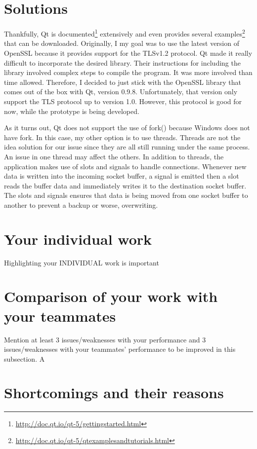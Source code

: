 \documentclass[12pt,a4paper]{report}
\begin{document}
	\section{Solutions}
	Thankfully, Qt is documented\footnote{\url{http://doc.qt.io/qt-5/gettingstarted.html}} extensively and even provides several examples\footnote{\url{http://doc.qt.io/qt-5/qtexamplesandtutorials.html}} that can be downloaded. Originally, I my goal was to use the latest version of OpenSSL because it provides support for the TLSv1.2 protocol. Qt made it really difficult to incorporate the desired library. Their instructions for including the library involved complex steps to compile the program. It was more involved than time allowed. Therefore, I decided to just stick with the OpenSSL library that comes out of the box with Qt, version 0.9.8. Unfortunately, that version only support the TLS protocol up to version 1.0. However, this protocol is good for now, while the prototype is being developed. 
	
	As it turns out, Qt does not support the use of fork() because Windows does not have fork. In this case, my other option is to use threads. Threads are not the idea solution for our issue since they are all still running under the same process. An issue in one thread may affect the others. In addition to threads, the application makes use of slots and signals to handle connections. Whenever new data is written into the incoming socket buffer, a signal is emitted then a slot reads the buffer data and immediately writes it to the destination socket buffer. The slots and signals ensures that data is being moved from one socket buffer to another to prevent a backup or worse, overwriting.   
	
	\section{Your individual work}
	Highlighting your INDIVIDUAL work is important 
	\section{Comparison of your work with your teammates}
	
	Mention at least 3
	issues/weaknesses with your performance and 3 issues/weaknesses with your
	teammates' performance to be improved in this subsection. A
	
	\section{Shortcomings and their reasons}
	
\end{document}
